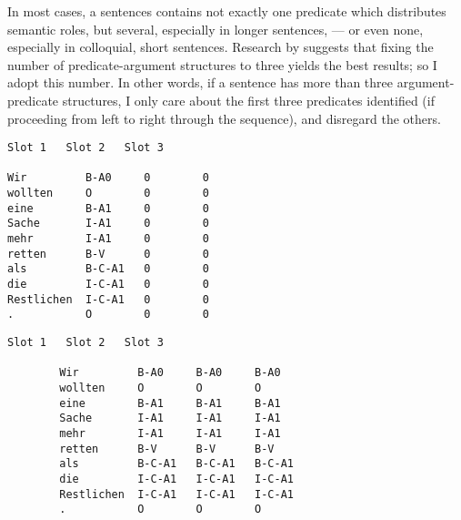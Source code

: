 In most cases, a sentences contains not exactly one predicate which distributes semantic roles,
but several, especially in longer sentences, --- or even none, especially in colloquial, short
sentences. Research by \citeauthor{zhang2019semantics} suggests that fixing the number of
predicate-argument structures to three yields the best results; so I adopt this number. In
other words, if a sentence has more than three argument-predicate structures, I only care about
the first three predicates identified (if proceeding from left to right through the sequence),
and disregard the others.



\begingroup
\begin{srl}[!h]
  \begin{minipage}{0.45\linewidth}
  \vspace{0pt}
    \begin{BVerbatim}[commandchars=\\\{\}, fontsize=\footnotesize]
            Slot 1   Slot 2   Slot 3

Wir         B-A0     0        0
wollten     O        0        0
eine        B-A1     0        0
Sache       I-A1     0        0
mehr        I-A1     0        0
retten      B-V      0        0
als         B-C-A1   0        0
die         I-C-A1   0        0
Restlichen  I-C-A1   0        0
.           O        0        0
      \end{BVerbatim}
  \end{minipage}
  \begin{minipage}{0.45\linewidth}
  \vspace{0pt}
    \begin{BVerbatim}[commandchars=\\\{\}, fontsize=\footnotesize]
                    Slot 1   Slot 2   Slot 3

        Wir         B-A0     B-A0     B-A0
        wollten     O        O        O
        eine        B-A1     B-A1     B-A1
        Sache       I-A1     I-A1     I-A1
        mehr        I-A1     I-A1     I-A1
        retten      B-V      B-V      B-V
        als         B-C-A1   B-C-A1   B-C-A1
        die         I-C-A1   I-C-A1   I-C-A1
        Restlichen  I-C-A1   I-C-A1   I-C-A1
        .           O        O        O
    \end{BVerbatim}
  \end{minipage}
\end{srl}
\label{srl:zeros-duplicate}
\endgroup


